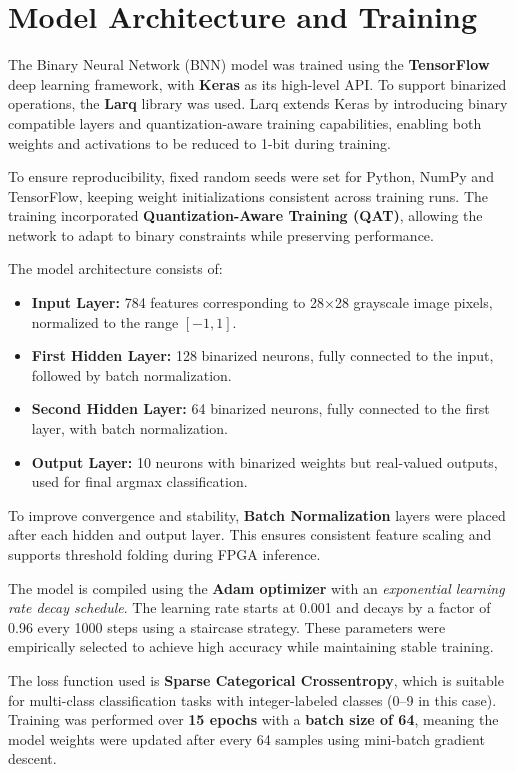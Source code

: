 \documentclass[a4paper,12pt]{report}
\begin{document}
\section{Model Architecture and Training}
The Binary Neural Network (BNN) model was trained using the \textbf{TensorFlow} deep learning framework, with \textbf{Keras} as its high-level API. To support binarized operations, the \textbf{Larq} library was used. Larq extends Keras by introducing binary compatible layers and quantization-aware training capabilities, enabling both weights and activations to be reduced to 1-bit during training.

To ensure reproducibility, fixed random seeds were set for Python, NumPy and TensorFlow, keeping weight initializations consistent across training runs. The training incorporated \textbf{Quantization-Aware Training (QAT)}, allowing the network to adapt to binary constraints while preserving performance.

The model architecture consists of:
\begin{itemize}
    \item \textbf{Input Layer:} 784 features corresponding to 28$\times$28 grayscale image pixels, normalized to the range $[-1, 1]$.
    \item \textbf{First Hidden Layer:} 128 binarized neurons, fully connected to the input, followed by batch normalization.
    \item \textbf{Second Hidden Layer:} 64 binarized neurons, fully connected to the first layer, with batch normalization.
    \item \textbf{Output Layer:} 10 neurons with binarized weights but real-valued outputs, used for final argmax classification.
\end{itemize}

To improve convergence and stability, \textbf{Batch Normalization} layers were placed after each hidden and output layer. This ensures consistent feature scaling and supports threshold folding during FPGA inference.

The model is compiled using the \textbf{Adam optimizer} with an \textit{exponential learning rate decay schedule}. The learning rate starts at 0.001 and decays by a factor of 0.96 every 1000 steps using a staircase strategy. These parameters were empirically selected to achieve high accuracy while maintaining stable training.

The loss function used is \textbf{Sparse Categorical Crossentropy}, which is suitable for multi-class classification tasks with integer-labeled classes (0–9 in this case). Training was performed over \textbf{15 epochs} with a \textbf{batch size of 64}, meaning the model weights were updated after every 64 samples using mini-batch gradient descent.
\end{document}
